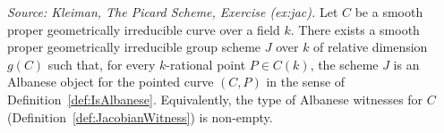 \begin{theorem}
  \label{thm:nonempty_jacobianWitness}

  \textit{Source: Kleiman, The Picard Scheme, Exercise (ex:jac).}
  Let \(C\) be a smooth proper geometrically irreducible curve over a field \(k\). There exists a smooth proper geometrically irreducible group scheme \(J\) over \(k\) of relative dimension \(g(C)\) such that, for every \(k\)-rational point \(P \in C(k)\), the scheme \(J\) is an Albanese object for the pointed curve \((C, P)\) in the sense of Definition~\ref{def:IsAlbanese}. Equivalently, the type of Albanese witnesses for \(C\) (Definition~\ref{def:JacobianWitness}) is non-empty.
\end{theorem}
